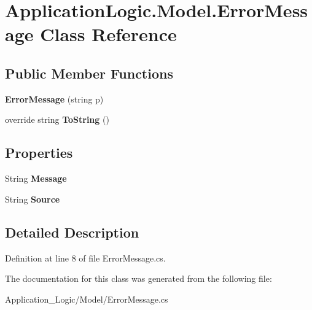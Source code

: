 \hypertarget{class_application_logic_1_1_model_1_1_error_message}{
\section{ApplicationLogic.Model.ErrorMessage Class Reference}
\label{class_application_logic_1_1_model_1_1_error_message}
}
\subsection*{Public Member Functions}
\begin{DoxyCompactItemize}
\item 
\hypertarget{class_application_logic_1_1_model_1_1_error_message_a486f1c90df86918f0b89ada31f4e41bc}{
{\bfseries ErrorMessage} (string p)}
\label{class_application_logic_1_1_model_1_1_error_message_a486f1c90df86918f0b89ada31f4e41bc}

\item 
\hypertarget{class_application_logic_1_1_model_1_1_error_message_ae131ed5689e488f4ed8ce6b36708ddaf}{
override string {\bfseries ToString} ()}
\label{class_application_logic_1_1_model_1_1_error_message_ae131ed5689e488f4ed8ce6b36708ddaf}

\end{DoxyCompactItemize}
\subsection*{Properties}
\begin{DoxyCompactItemize}
\item 
\hypertarget{class_application_logic_1_1_model_1_1_error_message_a4e87dc60ce08b849c616d08693bf95ac}{
String {\bfseries Message}}
\label{class_application_logic_1_1_model_1_1_error_message_a4e87dc60ce08b849c616d08693bf95ac}

\item 
\hypertarget{class_application_logic_1_1_model_1_1_error_message_aa44010a953353b468ccc58f85a89d3a2}{
String {\bfseries Source}}
\label{class_application_logic_1_1_model_1_1_error_message_aa44010a953353b468ccc58f85a89d3a2}

\end{DoxyCompactItemize}


\subsection{Detailed Description}


Definition at line 8 of file ErrorMessage.cs.



The documentation for this class was generated from the following file:\begin{DoxyCompactItemize}
\item 
Application\_\-Logic/Model/ErrorMessage.cs\end{DoxyCompactItemize}
